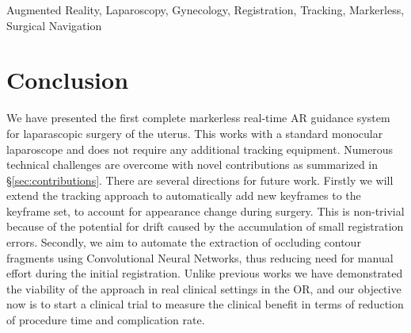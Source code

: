 \documentclass[journal]{IEEEtran}
\begin{document}
\begin{IEEEkeywords}
Augmented Reality, Laparoscopy, Gynecology, Registration, Tracking, Markerless, Surgical Navigation
\end{IEEEkeywords}



%
\IEEEpeerreviewmaketitle













  
\section{Conclusion}
\label{sec:conclusion}
We have presented the first complete markerless real-time AR guidance system for laparascopic surgery of the uterus. This works with a standard monocular laparoscope and does not require any additional tracking equipment. Numerous technical challenges are overcome with novel contributions as summarized in \S\ref{sec:contributions}. There are several directions for future work. Firstly we will extend the tracking approach to automatically add new keyframes to the keyframe set, to account for appearance change during surgery. This is non-trivial because of the potential for drift caused by the accumulation of small registration errors. Secondly, we aim to automate the extraction of occluding contour fragments using Convolutional Neural Networks, thus reducing need for manual effort during the initial registration. Unlike previous works we have demonstrated the viability of the approach in real clinical settings in the OR, and our objective now is to start a clinical trial to measure the clinical benefit in terms of reduction of procedure time and complication rate.
\end{document}
